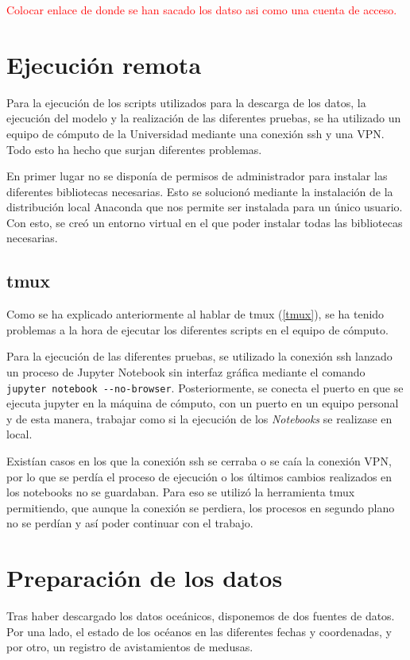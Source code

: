 \textcolor{red}{Colocar enlace de donde se han sacado los datso asi como una cuenta de acceso.}

\section{Ejecución remota}
Para la ejecución de los scripts utilizados para la descarga de los datos, la ejecución del modelo y la realización de las diferentes pruebas, se ha utilizado un equipo de cómputo de la Universidad mediante una conexión ssh y una VPN. Todo esto ha hecho que surjan diferentes problemas.

En primer lugar no se disponía de permisos de administrador para instalar las diferentes bibliotecas necesarias. Esto se solucionó mediante la instalación de la distribución local Anaconda que nos permite ser instalada para un único usuario. Con esto, se creó un entorno virtual en el que poder instalar todas las bibliotecas necesarias.

\subsection{tmux}
Como se ha explicado anteriormente al hablar de tmux (\ref{tmux}), se ha tenido problemas a la hora de ejecutar los diferentes scripts en el equipo de cómputo.

Para la ejecución de las diferentes pruebas, se utilizado la conexión ssh lanzado un proceso de Jupyter Notebook sin interfaz gráfica mediante el comando \verb|jupyter notebook --no-browser|. Posteriormente, se conecta el puerto en que se ejecuta jupyter en la máquina de cómputo, con un puerto en un equipo personal y de esta manera, trabajar como si la ejecución de los \emph{Notebooks} se realizase en local.


Existían casos en los que la conexión ssh se cerraba o se caía la conexión VPN, por lo que se perdía el proceso de ejecución o los últimos cambios realizados en los notebooks no se guardaban. Para eso se utilizó la herramienta tmux permitiendo, que aunque la conexión se perdiera, los procesos en segundo plano no se perdían y así poder continuar con el trabajo.

\section{Preparación de los datos}\textsl{}
Tras haber descargado los datos oceánicos, disponemos de dos fuentes de datos. Por una lado, el estado de los océanos en las diferentes fechas y coordenadas, y por otro, un registro de avistamientos de medusas.

